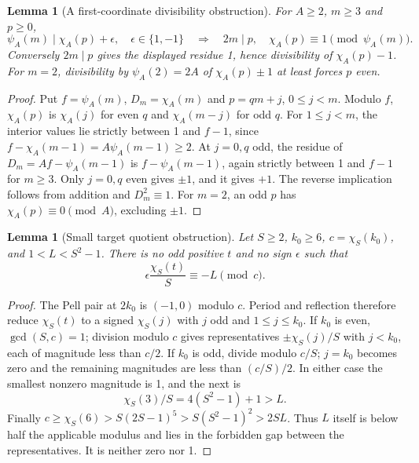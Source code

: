 \documentclass[11pt,letterpaper]{article}
\newtheorem{lemma}[theorem]{Lemma}
\theoremstyle{definition}\newtheorem{definition}[theorem]{Definition}
\theoremstyle{remark}\newtheorem{remark}[theorem]{Remark}
\newcommand{\ch}[2]{\chi_{#1}(#2)}\newcommand{\ps}[2]{\psi_{#1}(#2)}
\begin{document}
\begin{lemma}[A first-coordinate divisibility obstruction]\label{fup:fc:lem:firstcoord}
For $A\ge2$, $m\ge3$ and $p\ge0$,
\[
 \ps A m\mid\ch A p+\epsilon,\quad\epsilon\in\{1,-1\}
 \quad\Longrightarrow\quad 2m\mid p,\quad\ch A p\equiv1\pmod{\ps A m}.
\]
Conversely $2m\mid p$ gives the displayed residue 1, hence divisibility
of $\ch A p-1$. For $m=2$, divisibility by $\ps A2=2A$ of
$\ch A p\pm1$ at least forces $p$ even.
\end{lemma}
\begin{proof}
Put $f=\ps A m$, $D_m=\ch A m$ and $p=qm+j$, $0\le j<m$.
Modulo $f$, $\ch A p$ is $\ch A j$ for even $q$ and
$\ch A{m-j}$ for odd $q$. For $1\le j<m$, the interior values lie
strictly between 1 and $f-1$, since
$f-\ch A{m-1}=A\ps A{m-1}\ge2$.
At $j=0,q$ odd, the residue of $D_m=Af-\ps A{m-1}$ is
$f-\ps A{m-1}$, again strictly between 1 and $f-1$ for $m\ge3$.
Only $j=0,q$ even gives $\pm1$, and it gives $+1$.
The reverse implication follows from addition and $D_m^2\equiv1$.
For $m=2$, an odd $p$ has $\ch A p\equiv0\pmod A$, excluding $\pm1$.
\end{proof}

\begin{lemma}[Small target quotient obstruction]\label{fup:fc:lem:smalltarget}
Let $S\ge2$, $k_0\ge6$, $c=\ch S{k_0}$, and $1<L<S^2-1$.
There is no odd positive $t$ and no sign $\epsilon$ such that
\[
 \epsilon\frac{\ch S t}S\equiv-L\pmod c.
\]
\end{lemma}
\begin{proof}
The Pell pair at $2k_0$ is $(-1,0)$ modulo $c$. Period and reflection
therefore reduce $\ch S t$ to a signed $\ch S j$ with $j$ odd and
$1\le j\le k_0$. If $k_0$ is even, $\gcd(S,c)=1$; division modulo $c$
gives representatives $\pm\ch S j/S$ with $j<k_0$, each of magnitude
less than $c/2$. If $k_0$ is odd, divide modulo $c/S$; $j=k_0$ becomes
zero and the remaining magnitudes are less than $(c/S)/2$.
In either case the smallest nonzero magnitude is 1, and the next is
\[
 \ch S3/S=4(S^2-1)+1>L.
\]
Finally $c\ge\ch S6>S(2S-1)^5>S(S^2-1)^2>2SL$.
Thus $L$ itself is below half the applicable modulus and lies in the
forbidden gap between the representatives. It is neither zero nor 1.
\end{proof}
\end{document}
